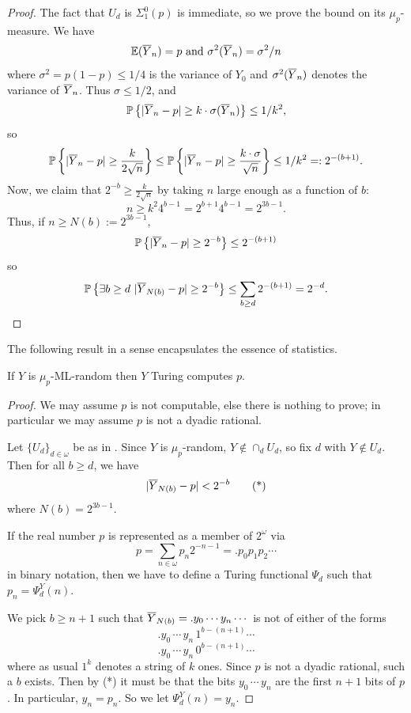 \begin{proof}%
The fact that $U_d$ is $\Sigma^0_1(p)$ is immediate, so we prove the bound on its $\mu_p$-measure. We have 
\[
\mathbb{E}(\overline Y_n) = p \text{ and }\sigma^2(\overline Y_n) = \sigma^2/n
\]
where $\sigma^2=p(1-p)\le 1/4$ is the variance of $Y_0$ and $\sigma^2(\overline Y_n)$ denotes the variance of $\overline Y_n$. Thus $\sigma\le 1/2$, and
\[
\mathbb{P}\left\{|\overline Y_n-p|\ge k\cdot\sigma(\overline Y_n)\right\} \le 1/k^2,
\]
so 
\[
\mathbb{P}\left\{|\overline Y_n-p|\ge \frac{k}{2\sqrt{n}}\right\} \le
\mathbb{P}\left\{|\overline Y_n-p|\ge \frac{k\cdot\sigma}{\sqrt{n}}\right\} \le 1/k^2 =: 2^{-(b+1)}.
\]
Now, we claim that $2^{-b}\ge\frac{k}{2\sqrt{n}}$ by taking $n$ large enough as a function of $b$:
\[
n\ge k^2 4^{b-1}=2^{b+1}4^{b-1}=2^{3b-1}.
\]
Thus, if $n\ge N(b):=2^{3b-1}$, 
\[
\mathbb{P}\left\{|\overline Y_n-p|\ge 2^{-b}\right\} \le 2^{-(b+1)}
\]
so
\[
\mathbb{P}\left\{\exists b\ge d\,\,|\overline Y_{N(b)}-p|\ge 2^{-b}\right\} \le \sum_{b\ge d} 2^{-(b+1)}=2^{-d}.
\]
\end{proof}

The following result in a sense encapsulates the essence of statistics.

\begin{theorem}\label{random_computes} %
	If $Y$ is $\mu_p$-ML-random then $Y$ Turing computes $p$. 
\end{theorem}
\begin{proof}
We may assume $p$ is not computable, else there is nothing to prove; in particular we may assume $p$ is not a dyadic rational.

Let $\{U_d\}_{d\in\omega}$ be as in . Since $Y$ is $\mu_p$-random, $Y\not\in\cap_d U_d$, so fix $d$ with $Y\not\in U_d$. Then for all $b\ge d$, we have
\[
|\overline Y_{N(b)}-p|< 2^{-b} \tag{*}
\]
where $N(b)=2^{3b-1}$. 

If the real number $p$ is represented as a member of $2^\omega$ via
\[
p = \sum_{n\in\omega} p_n 2^{-n-1} = .p_0 p_1 p_2\cdots
\]
in binary notation, then we have to define a Turing functional $\Psi_d$ such that $p_n=\Psi_d^Y(n)$.

We pick $b\ge n+1$ such that $\overline Y_{N(b)}=.y_0\cdots y_n\cdots$ is not of either of the forms
\[
.y_0\,\cdots \,y_{n} \,1^{b-(n+1)} \cdots
\]
\[
.y_0\,\cdots \,y_{n} \,0^{b-(n+1)} \cdots
\]
where as usual $1^k$ denotes a string of $k$ ones.
Since $p$ is not a dyadic rational, such a $b$ exists. Then by (*) it must be that the bits $y_0\,\cdots\,y_{n}$ are the first $n+1$ bits of $p$. In particular, $y_n=p_n$. So we let $\Psi_d^Y(n)=y_n$.
\end{proof}


